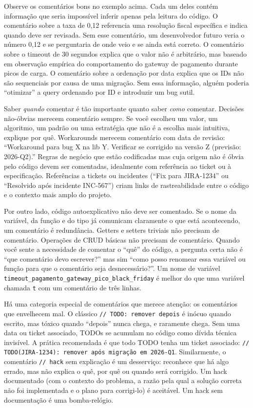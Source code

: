 Observe os comentários bons no exemplo acima. Cada um deles contém
informação que seria impossível inferir apenas pela leitura do código.
O comentário sobre a taxa de 0,12 referencia uma resolução fiscal
específica e indica quando deve ser revisada. Sem esse comentário,
um desenvolvedor futuro veria o número 0,12 e se perguntaria de onde
veio e se ainda está correto. O comentário sobre o timeout de 30
segundos explica que o valor não é arbitrário, mas baseado em
observação empírica do comportamento do gateway de pagamento durante
picos de carga. O comentário sobre a ordenação por data explica que
os IDs não são sequenciais por causa de uma migração. Sem essa
informação, alguém poderia ``otimizar'' a query ordenando por ID e
introduzir um bug sutil.

Saber \textit{quando} comentar é tão importante quanto saber
\textit{como} comentar. Decisões não-óbvias merecem comentário sempre.
Se você escolheu um valor, um algoritmo, um padrão ou uma estratégia
que não é a escolha mais intuitiva, explique por quê. Workarounds
merecem comentário com data de revisão: ``Workaround para bug X na
lib Y. Verificar se corrigido na versão Z (previsão: 2026-Q2).''
Regras de negócio que estão codificadas mas cuja origem não é óbvia
pelo código devem ser comentadas, idealmente com referência ao ticket
ou à especificação. Referências a tickets ou incidentes (``Fix
para JIRA-1234'' ou ``Resolvido após incidente INC-567'') criam
links de rastreabilidade entre o código e o contexto mais amplo do
projeto.

Por outro lado, código autoexplicativo não deve ser comentado. Se o
nome da variável, da função e do tipo já comunicam claramente o que
está acontecendo, um comentário é redundância. Getters e setters
triviais não precisam de comentário. Operações de CRUD básicas não
precisam de comentário. Quando você sente a necessidade de comentar
o ``quê'' do código, a pergunta certa não é ``que comentário devo
escrever?'' mas sim ``como posso renomear essa variável ou função
para que o comentário seja desnecessário?''. Um nome de variável
\texttt{timeout\_pagamento\_gateway\_pico\_black\_friday} é melhor
do que uma variável chamada \texttt{t} com um comentário de três
linhas.

Há uma categoria especial de comentários que merece atenção: os
comentários que envelhecem mal. O clássico \texttt{// TODO: remover
depois} é inócuo quando escrito, mas tóxico quando ``depois'' nunca
chega, e raramente chega. Sem uma data ou ticket associado, TODOs
se acumulam no código como dívida técnica invisível. A prática
recomendada é que todo TODO tenha um ticket associado:
\texttt{// TODO(JIRA-1234): remover após migração em 2026-Q1}.
Similarmente, o comentário \texttt{// hack} sem explicação é um
desserviço: reconhece que há algo errado, mas não explica o quê,
por quê ou quando será corrigido. Um hack documentado (com o
contexto do problema, a razão pela qual a solução correta não foi
implementada e o plano para corrigi-lo) é aceitável. Um hack
sem documentação é uma bomba-relógio.


